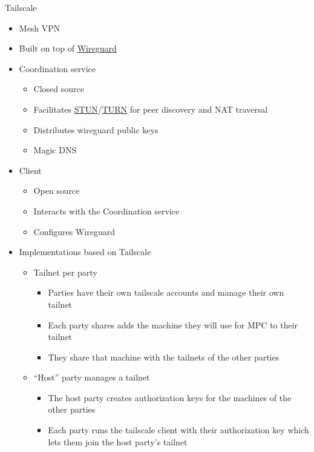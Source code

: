 \hypertarget{notes__02052-tailscale.md}{}
\begin{block}{Tailscale}
\protect\hypertarget{notes__02052-tailscale.md__tailscale}{}
\begin{itemize}
\tightlist
\item
  Mesh VPN
\item
  Built on top of
  \protect\hyperlink{notes__02051-wireguard.md}{Wireguard}
\item
  Coordination service

  \begin{itemize}
  \tightlist
  \item
    Closed source
  \item
    Facilitates
    \href{notes/0202-nat\#Session\%20Traversal\%20Utilities\%20for\%20NAT\%20(STUN)}{STUN}/\protect\hyperlink{notes__02021-internet-protocol.md__test}{TURN}
    for peer discovery and NAT traversal
  \item
    Distributes wireguard public keys
  \item
    Magic DNS
  \end{itemize}
\item
  Client

  \begin{itemize}
  \tightlist
  \item
    Open source
  \item
    Interacts with the Coordination service
  \item
    Configures Wireguard
  \end{itemize}
\item
  Implementations based on Tailscale

  \begin{itemize}
  \tightlist
  \item
    Tailnet per party

    \begin{itemize}
    \tightlist
    \item
      Parties have their own tailscale accounts and manage their own
      tailnet
    \item
      Each party shares adds the machine they will use for MPC to their
      tailnet
    \item
      They share that machine with the tailnets of the other parties
    \end{itemize}
  \item
    ``Host'' party manages a tailnet

    \begin{itemize}
    \tightlist
    \item
      The host party creates authorization keys for the machines of the
      other parties
    \item
      Each party runs the tailscale client with their authorization key
      which lets them join the host party's tailnet
    \end{itemize}
  \end{itemize}
\end{itemize}
\end{block}

